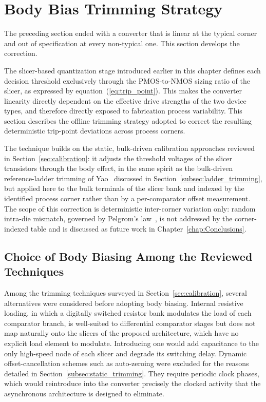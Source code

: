 \section{Body Bias Trimming Strategy}
\label{chap:trimming}

The preceding section ended with a converter that is linear at the typical corner and out of specification at every non-typical one. This section develops the correction.

The slicer-based quantization stage introduced earlier in this chapter
defines each decision threshold exclusively through the PMOS-to-NMOS sizing
ratio of the slicer, as expressed by equation~(\ref{eq:trip_point}). This
makes the converter linearity directly dependent on the effective drive
strengths of the two device types, and therefore directly exposed to
fabrication process variability. This section describes the offline trimming
strategy adopted to correct the resulting deterministic trip-point deviations
across process corners.

The technique builds on the static, bulk-driven
calibration approaches reviewed in Section~\ref{sec:calibration}: it adjusts
the threshold voltages of the slicer transistors through the body effect, in
the same spirit as the bulk-driven reference-ladder trimming of
Yao~\cite{yao_bulk_2011} discussed in Section~\ref{subsec:ladder_trimming},
but applied here to the bulk terminals of the slicer bank and indexed by the
identified process corner rather than by a per-comparator offset measurement.
The scope of this correction is deterministic inter-corner variation only:
random intra-die mismatch, governed by Pelgrom's
law~\cite{pelgrom_1989}, is not addressed by the corner-indexed table and is
discussed as future work in Chapter~\ref{chap:Conclusions}.

\subsection{Choice of Body Biasing Among the Reviewed Techniques}

Among the trimming techniques surveyed in Section~\ref{sec:calibration},
several alternatives were considered before adopting body biasing. Internal
resistive loading, in which a digitally switched resistor bank modulates the
load of each comparator branch, is well-suited to differential comparator
stages but does not map naturally onto the slicers of the proposed
architecture, which have no explicit load element to modulate. Introducing one
would add capacitance to the only high-speed node of each slicer and degrade
its switching delay. Dynamic offset-cancellation schemes such as auto-zeroing
were excluded for the reasons detailed in Section~\ref{subsec:static_trimming}.
They require periodic clock phases, which would reintroduce into the converter
precisely the clocked activity that the asynchronous architecture is designed
to eliminate.

